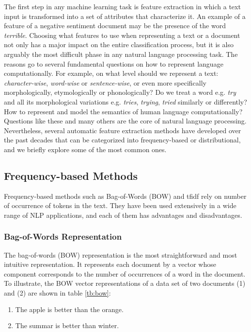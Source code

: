 The first step in any machine learning task is feature extraction in which a text input is transformed into a set of attributes that characterize it. An example of a feature of a negative sentiment document may be the presence of the word \emph{terrible}. Choosing what features to use when representing a text or a document not only has a major impact on the entire classification process, but it is also arguably the most difficult phase in any natural language processing task. The reasons go to several fundamental questions on how to represent language computationally. For example, on what level should we represent a text: \emph{character-wise}, \emph{word-wise} or \emph{sentence-wise}, or even more specifically morphologically, etymologically or phonologically? Do we treat a word e.g. \emph{try} and all its morphological variations e.g. \emph{tries}, \emph{trying}, \emph{tried} similarly or differently? How to represent and model the semantics of human language computationally? Questions like these and many others are the core of natural language processing. Nevertheless, several automatic feature extraction methods have developed over the past decades that can be categorized into frequency-based or distributional, and we briefly explore some of the most common ones.

\subsection{Frequency-based Methods}

Frequency-based methods such as Bag-of-Words (BOW) and tfidf rely on number of occurrence of tokens in the text. They have been used extensively in a wide range of NLP applications, and each of them has advantages and disadvantages. 
\subsubsection*{Bag-of-Words Representation}

The bag-of-words (BOW) representation is the most straightforward and most intuitive
representation. It represents each document by a vector
whose component corresponds to the number of occurrences of a word in
the document.  To illustrate, the BOW vector representations of a data set of two documents (1) and (2) are shown in table \ref{tb:bow}:

\begin{enumerate}
\item The apple is better than the orange.
\item The summar is better than winter. 
\end{enumerate}





